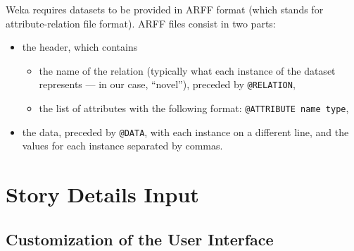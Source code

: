 \documentclass{mproj}
\begin{document}
Weka requires datasets to be provided in ARFF format (which stands for attribute-relation file format). \cite{arff} ARFF files consist in two parts:
\begin{itemize}[topsep=0pt]
	\item the header, which contains 
	\begin{itemize}
		\item the name of the relation (typically what each instance of the dataset represents --- in our case, ``novel''), preceded by \verb|@RELATION|,
		\item the list of attributes with the following format: \verb|@ATTRIBUTE name type|,
	\end{itemize}
	\item the data, preceded by \verb|@DATA|, with each instance on a different line, and the values for each instance separated by commas.
\end{itemize}

\section{Story Details Input}

\subsection*{Customization of the User Interface}
\end{document}
